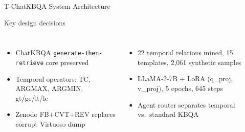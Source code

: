 \begin{frame}[shrink=15]{T-ChatKBQA System Architecture}
  \begin{center}
    \vspace{-0.3cm}
    
  \end{center}
  \vspace{0.1cm}
  \begin{exampleblock}{Key design decisions}
    \scriptsize
    \begin{columns}[T]
      \begin{itemize}
        \item ChatKBQA \texttt{generate-then-retrieve} core preserved
        \item Temporal operators: TC, ARGMAX, ARGMIN, gt/ge/lt/le
        \item Zenodo FB+CVT+REV replaces corrupt Virtuoso dump
      \end{itemize}
      \begin{itemize}
        \item 22 temporal relations mined, 15 templates, 2,061 synthetic samples
        \item LLaMA-2-7B + LoRA (q\_proj, v\_proj), 5 epochs, 645 steps
        \item Agent router separates temporal vs.\ standard KBQA
      \end{itemize}
    \end{columns}
  \end{exampleblock}
\end{frame}

